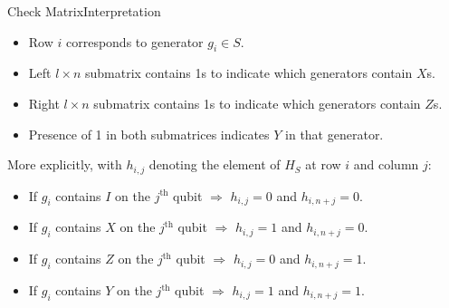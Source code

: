 \begin{frame}{Check Matrix}{Interpretation}
    \begin{itemize}
        \setlength{\itemsep}{0.25\baselineskip}
        \item
        Row \(i\) corresponds to generator \(g_i\in S\).
        \item
        Left \(l\times n\) submatrix contains 1s to indicate which generators contain \(X\)s.
        \item
        Right \(l\times n\) submatrix contains 1s to indicate which generators contain \(Z\)s.
        \item
        Presence of 1 in both submatrices indicates \(Y\) in that generator.
    \end{itemize}

    \vspace*{2mm}
    More explicitly, with \(h_{i,j}\) denoting the element of \(H_S\) at row \(i\) and column \(j\):
    \vspace*{2mm}
    \begin{itemize}
        \setlength{\itemsep}{0.25\baselineskip}
        \item
        If \(g_i\) contains \(I\) on the \(j^{\text{th}}\) qubit
        \(\Longrightarrow\)
        \(h_{i,j}=0\) and \(h_{i,n+j}=0\).
        \item
        If \(g_i\) contains \(X\) on the \(j^{\text{th}}\) qubit
        \(\Longrightarrow\)
        \(h_{i,j}=1\) and \(h_{i,n+j}=0\).
        \item
        If \(g_i\) contains \(Z\) on the \(j^{\text{th}}\) qubit
        \(\Longrightarrow\)
        \(h_{i,j}=0\) and \(h_{i,n+j}=1\).
        \item
        If \(g_i\) contains \(Y\) on the \(j^{\text{th}}\) qubit
        \(\Longrightarrow\)
        \(h_{i,j}=1\) and \(h_{i,n+j}=1\).
    \end{itemize}

    \vspace*{4mm}

\end{frame}


